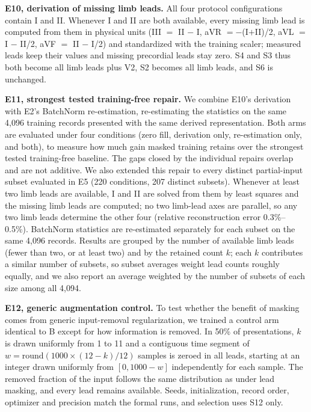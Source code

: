 \textbf{E10, derivation of missing limb leads.} All four protocol configurations contain I and II. Whenever I and II are both available, every missing limb lead is computed from them in physical units (III $=$ II $-$ I, aVR $=-$(I$+$II)/2, aVL $=$ I $-$ II/2, aVF $=$ II $-$ I/2) and standardized with the training scaler; measured leads keep their values and missing precordial leads stay zero. S4 and S3 thus both become all limb leads plus V2, S2 becomes all limb leads, and S6 is unchanged.

\textbf{E11, strongest tested training-free repair.} We combine E10's derivation with E2's BatchNorm re-estimation, re-estimating the statistics on the same 4,096 training records presented with the same derived representation. Both arms are evaluated under four conditions (zero fill, derivation only, re-estimation only, and both), to measure how much gain masked training retains over the strongest tested training-free baseline. The gaps closed by the individual repairs overlap and are not additive. We also extended this repair to every distinct partial-input subset evaluated in E5 (220 conditions, 207 distinct subsets). Whenever at least two limb leads are available, I and II are solved from them by least squares and the missing limb leads are computed; no two limb-lead axes are parallel, so any two limb leads determine the other four (relative reconstruction error 0.3\%--0.5\%). BatchNorm statistics are re-estimated separately for each subset on the same 4,096 records. Results are grouped by the number of available limb leads (fewer than two, or at least two) and by the retained count $k$; each $k$ contributes a similar number of subsets, so subset averages weight lead counts roughly equally, and we also report an average weighted by the number of subsets of each size among all 4,094.

\textbf{E12, generic augmentation control.} To test whether the benefit of masking comes from generic input-removal regularization, we trained a control arm identical to B except for how information is removed. In 50\% of presentations, $k$ is drawn uniformly from 1 to 11 and a contiguous time segment of $w=\mathrm{round}(1000\times(12-k)/12)$ samples is zeroed in all leads, starting at an integer drawn uniformly from $[0, 1000-w]$ independently for each sample. The removed fraction of the input follows the same distribution as under lead masking, and every lead remains available. Seeds, initialization, record order, optimizer and precision match the formal runs, and selection uses S12 only.

